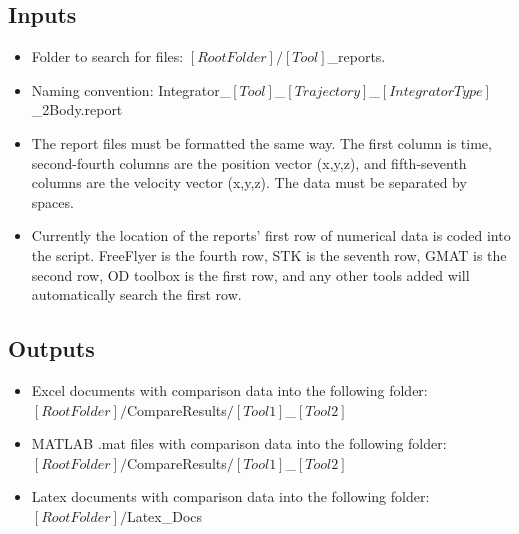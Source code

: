\subsection{Inputs}
\begin{itemize}
    \item Folder to search for files: $[Root Folder]/[Tool]$\_reports.
    \item Naming convention: Integrator\_$[Tool]$\_$[Trajectory]$\_$[IntegratorType]$\_2Body.report
    \item The report files must be formatted the same way. The first column is
    time, second-fourth columns are the position vector (x,y,z), and
    fifth-seventh columns are the velocity vector (x,y,z). The data must
    be separated by spaces.
    \item Currently the location of the reports'
    first row of numerical data is coded into the script. FreeFlyer is
    the fourth row, STK is the seventh row, GMAT is the second row, OD
    toolbox is the first row, and any other tools added will
    automatically search the first row.
\end{itemize}
\subsection{Outputs}
\begin{itemize}
    \item Excel documents with comparison data into the following
    folder:\\
    $[Root Folder]/$CompareResults$/[Tool1]$\_$[Tool2]$
    \item MATLAB .mat files with comparison data into the following
    folder:\\
    $[Root Folder]/$CompareResults$/[Tool1]$\_$[Tool2]$
    \item Latex documents with comparison data into the following
    folder:\\
    $[Root Folder]/$Latex\_Docs
\end{itemize}
